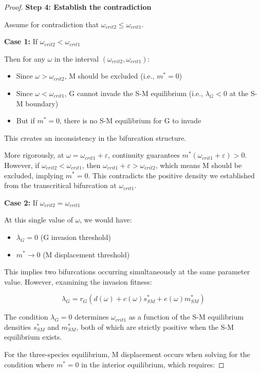 \documentclass[11pt]{article}
\newtheorem{proof}{Proof}
\begin{document}
\begin{proof}
\textbf{Step 4: Establish the contradiction}

Assume for contradiction that $\omega_{crit2} \leq \omega_{crit1}$.

\textbf{Case 1:} If $\omega_{crit2} < \omega_{crit1}$

Then for any $\omega$ in the interval $(\omega_{crit2}, \omega_{crit1})$:
\begin{itemize}
    \item Since $\omega > \omega_{crit2}$, M should be excluded (i.e., $m^* = 0$)
    \item Since $\omega < \omega_{crit1}$, G cannot invade the S-M equilibrium (i.e., $\lambda_G < 0$ at the S-M boundary)
    \item But if $m^* = 0$, there is no S-M equilibrium for G to invade
\end{itemize}

This creates an inconsistency in the bifurcation structure.

More rigorously, at $\omega = \omega_{crit1} + \varepsilon$, continuity guarantees $m^*(\omega_{crit1} + \varepsilon) > 0$. However, if $\omega_{crit2} < \omega_{crit1}$, then $\omega_{crit1} + \varepsilon > \omega_{crit2}$, which means M should be excluded, implying $m^* = 0$. This contradicts the positive density we established from the transcritical bifurcation at $\omega_{crit1}$.

\textbf{Case 2:} If $\omega_{crit2} = \omega_{crit1}$

At this single value of $\omega$, we would have:
\begin{itemize}
    \item $\lambda_G = 0$ (G invasion threshold)
    \item $m^* \to 0$ (M displacement threshold)
\end{itemize}

This implies two bifurcations occurring simultaneously at the same parameter value. However, examining the invasion fitness:

$$\lambda_G = r_G(d(\omega) + c(\omega) s^*_{SM} + e(\omega) m^*_{SM})$$

The condition $\lambda_G = 0$ determines $\omega_{crit1}$ as a function of the S-M equilibrium densities $s^*_{SM}$ and $m^*_{SM}$, both of which are strictly positive when the S-M equilibrium exists.

For the three-species equilibrium, M displacement occurs when solving for the condition where $m^* = 0$ in the interior equilibrium, which requires:


\end{proof}
\end{document}
